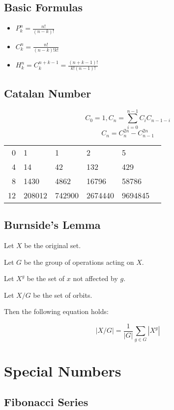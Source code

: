 \documentclass[twocolumn]{article}
\begin{document}
\subsection{Basic Formulas}

\begin{itemize}
    \item $P^n_k=\frac{n!}{(n-k)!}$
    \item $C^n_k=\frac{n!}{(n-k)!k!}$
    \item $H^n_k=C^{n+k-1}_k=\frac{(n+k-1)!}{k!(n-1)!}$
\end{itemize}

\subsection{Catalan Number}

$$
C_0=1, C_n=\sum_{i=0}^{n-1} C_i C_{n-1-i}
$$
$$
C_n=C_n^{2n}-C_{n-1}^{2n}
$$
\begin{center}
    \begin{tabular}{r|lllll}
        0 & 1 & 1 & 2 & 5 \\
        4 & 14 & 42 & 132 & 429 \\
        8 & 1430 & 4862 & 16796 & 58786 \\
        12 & 208012 & 742900 & 2674440 & 9694845
    \end{tabular}
\end{center}

\subsection{Burnside's Lemma}

Let $X$ be the original set.

Let $G$ be the group of operations acting on $X$.

Let $X^g$ be the set of $x$ not affected by $g$.

Let $X/G$ be the set of orbits.

Then the following equation holds:

$$
|X/G| = \frac{1}{|G|} \sum_{g \in G} |X^g|
$$

\section{Special Numbers}

\subsection{Fibonacci Series}
\end{document}
